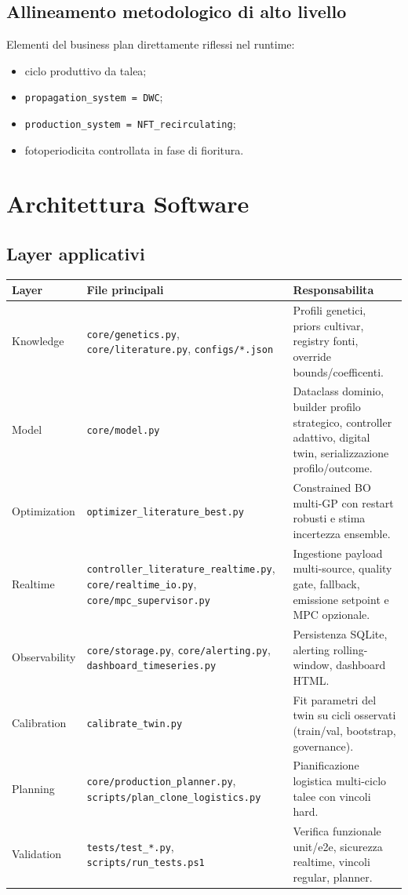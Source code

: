 ﻿\documentclass[11pt,a4paper]{report}
\begin{document}
\section{Allineamento metodologico di alto livello}
Elementi del business plan direttamente riflessi nel runtime:
\begin{itemize}
  \item ciclo produttivo da talea;
  \item \texttt{propagation\_system = DWC};
  \item \texttt{production\_system = NFT\_recirculating};
  \item fotoperiodicita controllata in fase di fioritura.
\end{itemize}

\newpage
\chapter{Architettura Software}

\section{Layer applicativi}
\begin{longtable}{@{}p{2.8cm}p{5.0cm}p{7.2cm}@{}}
\toprule
Layer & File principali & Responsabilita \\ \midrule
Knowledge & \texttt{core/genetics.py}, \texttt{core/literature.py}, \texttt{configs/*.json} & Profili genetici, priors cultivar, registry fonti, override bounds/coefficenti. \\
Model & \texttt{core/model.py} & Dataclass dominio, builder profilo strategico, controller adattivo, digital twin, serializzazione profilo/outcome. \\
Optimization & \texttt{optimizer\_literature\_best.py} & Constrained BO multi-GP con restart robusti e stima incertezza ensemble. \\
Realtime & \texttt{controller\_literature\_realtime.py}, \texttt{core/realtime\_io.py}, \texttt{core/mpc\_supervisor.py} & Ingestione payload multi-source, quality gate, fallback, emissione setpoint e MPC opzionale. \\
Observability & \texttt{core/storage.py}, \texttt{core/alerting.py}, \texttt{dashboard\_timeseries.py} & Persistenza SQLite, alerting rolling-window, dashboard HTML. \\
Calibration & \texttt{calibrate\_twin.py} & Fit parametri del twin su cicli osservati (train/val, bootstrap, governance). \\
Planning & \texttt{core/production\_planner.py}, \texttt{scripts/plan\_clone\_logistics.py} & Pianificazione logistica multi-ciclo talee con vincoli hard. \\
Validation & \texttt{tests/test\_*.py}, \texttt{scripts/run\_tests.ps1} & Verifica funzionale unit/e2e, sicurezza realtime, vincoli regular, planner. \\
\bottomrule
\end{longtable}
\end{document}
